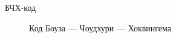 \Abbreviations %
\begin{description}

\item[БЧХ-код] Код Боуза — Чоудхури — Хоквингема

\end{description}


